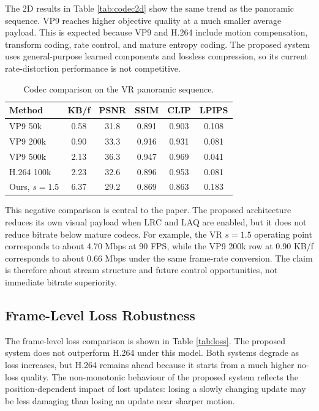 \documentclass[conference]{IEEEtran}
\begin{document}
The 2D results in Table \ref{tab:codec2d} show the same trend as the panoramic sequence. VP9 reaches higher objective quality at a much smaller average payload. This is expected because VP9 and H.264 include motion compensation, transform coding, rate control, and mature entropy coding. The proposed system uses general-purpose learned components and lossless compression, so its current rate-distortion performance is not competitive.

\begin{table}[t]
\caption{Codec comparison on the VR panoramic sequence.}
\label{tab:codec}
\centering
\footnotesize
\begin{tabular}{lccccc}
\toprule
Method & KB/f & PSNR & SSIM & CLIP & LPIPS \\
\midrule
VP9 50k & 0.58 & 31.8 & 0.891 & 0.903 & 0.108 \\
VP9 200k & 0.90 & 33.3 & 0.916 & 0.931 & 0.081 \\
VP9 500k & 2.13 & 36.3 & 0.947 & 0.969 & 0.041 \\
H.264 100k & 2.23 & 32.6 & 0.896 & 0.953 & 0.081 \\
Ours, $s=1.5$ & 6.37 & 29.2 & 0.869 & 0.863 & 0.183 \\
\bottomrule
\end{tabular}
\end{table}

This negative comparison is central to the paper. The proposed architecture reduces its own visual payload when LRC and LAQ are enabled, but it does not reduce bitrate below mature codecs. For example, the VR $s=1.5$ operating point corresponds to about 4.70 Mbps at 90 FPS, while the VP9 200k row at 0.90 KB/f corresponds to about 0.66 Mbps under the same frame-rate conversion. The claim is therefore about stream structure and future control opportunities, not immediate bitrate superiority.

\subsection{Frame-Level Loss Robustness}

The frame-level loss comparison is shown in Table \ref{tab:loss}. The proposed system does not outperform H.264 under this model. Both systems degrade as loss increases, but H.264 remains ahead because it starts from a much higher no-loss quality. The non-monotonic behaviour of the proposed system reflects the position-dependent impact of lost updates: losing a slowly changing update may be less damaging than losing an update near sharper motion.
\end{document}

